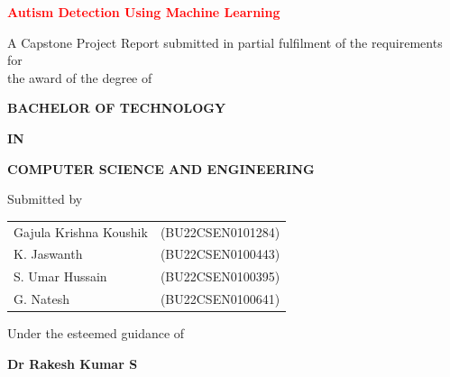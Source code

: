 \documentclass[12pt,a4paper]{report}
\begin{document}

\begin{center}
\vspace{-1cm}
{\Large \textcolor{red}{\textbf{
Autism Detection Using Machine Learning
}}}

\vspace{1cm}

A Capstone Project Report submitted in partial fulfilment of the requirements for\\
the award of the degree of

\vspace{0.6cm}

{\large \textcolor{blue!70!black}{\textbf{BACHELOR OF TECHNOLOGY}}}

\vspace{0.3cm}

{\large \textcolor{blue!70!black}{\textbf{IN}}}

\vspace{0.3cm}

{\large \textcolor{blue!70!black}{\textbf{COMPUTER SCIENCE AND ENGINEERING}}}

\vspace{1cm}

Submitted by

\vspace{0.5cm}


\begin{tabular}{ll}
Gajula Krishna Koushik & (BU22CSEN0101284) \\
K. Jaswanth & (BU22CSEN0100443) \\
S. Umar Hussain & (BU22CSEN0100395) \\
G. Natesh & (BU22CSEN0100641)
\end{tabular}

\vspace{1cm}


Under the esteemed guidance of

\vspace{0.3cm}

\textbf{Dr Rakesh Kumar S}


\end{center}
\end{document}
